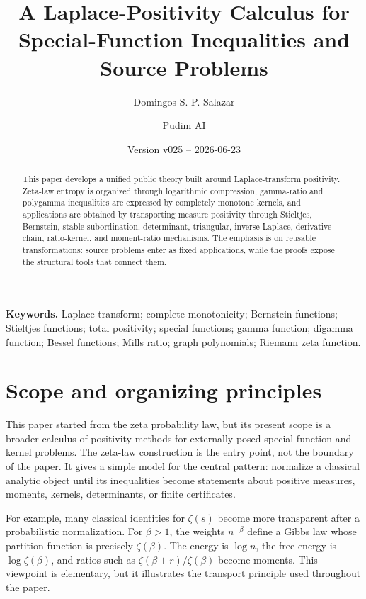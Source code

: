 \documentclass[11pt]{article}
\title{A Laplace-Positivity Calculus for Special-Function Inequalities and Source Problems}
\author{Domingos S. P. Salazar \and Pudim AI}
\date{Version v025 -- 2026-06-23}
\numberwithin{equation}{section}
\theoremstyle{definition}
\theoremstyle{remark}
\newcommand{\1}{\mathbf 1}
\begin{document}
\maketitle

\begin{abstract}
This paper develops a unified public theory built around Laplace-transform
positivity.  Zeta-law entropy is organized through logarithmic compression,
gamma-ratio and polygamma inequalities are expressed by completely monotone
kernels, and applications are obtained by transporting measure positivity
through Stieltjes, Bernstein, stable-subordination, determinant, triangular,
inverse-Laplace, derivative-chain, ratio-kernel, and moment-ratio mechanisms.
The emphasis is on reusable transformations: source problems enter as fixed
applications, while the proofs expose the structural tools that connect them.
\end{abstract}

\tableofcontents

\medskip



\noindent\textbf{Keywords.} Laplace transform; complete monotonicity; Bernstein functions; Stieltjes functions; total positivity; special functions; gamma function; digamma function; Bessel functions; Mills ratio; graph polynomials; Riemann zeta function.

\section{Scope and organizing principles}

This paper started from the zeta probability law, but its present scope is a
broader calculus of positivity methods for externally posed special-function
and kernel problems.  The zeta-law construction is the entry point, not the
boundary of the paper.  It gives a simple model for the central pattern:
normalize a classical analytic object until its inequalities become statements
about positive measures, moments, kernels, determinants, or finite
certificates.

For example, many classical identities for \(\zeta(s)\) become more
transparent after a probabilistic normalization.  For \(\beta>1\), the weights
\(n^{-\beta}\) define a Gibbs law whose partition function is precisely
\(\zeta(\beta)\).  The energy is \(\log n\), the free energy is
\(\log\zeta(\beta)\), and ratios such as
\(\zeta(\beta+r)/\zeta(\beta)\) become moments.  This viewpoint is elementary,
but it illustrates the transport principle used throughout the paper.
\end{document}
